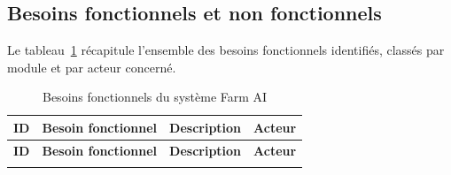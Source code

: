 
\subsection{Besoins fonctionnels et non fonctionnels}

Le tableau~\ref{tab:besoins_fonctionnels} récapitule l'ensemble des besoins fonctionnels
identifiés, classés par module et par acteur concerné.

\begin{longtable}{|c|>{\raggedright\arraybackslash}p{5cm}|>{\raggedright\arraybackslash}p{6cm}|l|}
  \caption{Besoins fonctionnels du système Farm AI} \label{tab:besoins_fonctionnels} \\
  \hline
  \rowcolor{gray!20}
  \textbf{ID} & \textbf{Besoin fonctionnel} & \textbf{Description} & \textbf{Acteur} \\
  \hline
  \endfirsthead
  \hline
  \rowcolor{gray!20}
  \textbf{ID} & \textbf{Besoin fonctionnel} & \textbf{Description} & \textbf{Acteur} \\
  \hline
  \endhead
  \hline
  \endfoot


\end{longtable}
